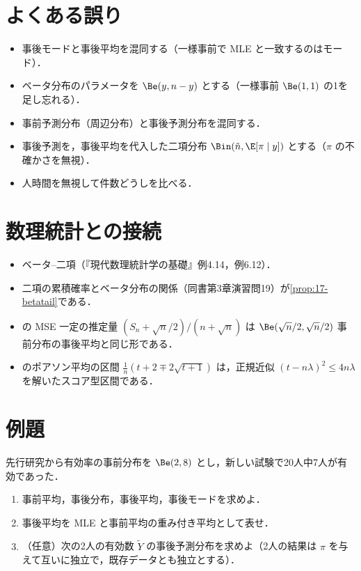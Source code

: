 \section{よくある誤り}\label{sec:17-err}
\begin{warnbox}
\begin{itemize}
\item 事後モードと事後平均を混同する（一様事前で MLE と一致するのはモード）．
\item ベータ分布のパラメータを $\Be(y,n-y)$ とする（一様事前 $\Be(1,1)$ の1を足し忘れる）．
\item 事前予測分布（周辺分布）と事後予測分布を混同する．
\item 事後予測を，事後平均を代入した二項分布 $\Bin(\tilde n,\E[\pi\mid y])$ とする（$\pi$ の不確かさを無視）．
\item 人時間を無視して件数どうしを比べる．
\end{itemize}
\end{warnbox}

\section{数理統計との接続}\label{sec:17-link}
\begin{linkbox}
\begin{itemize}
\item ベータ--二項（『現代数理統計学の基礎』例4.14，例6.12）．
\item 二項の累積確率とベータ分布の関係（同書第3章演習問19）が\cref{prop:17-betatail}である．
\item {} の MSE 一定の推定量 $(S_n+\sqrt n/2)/(n+\sqrt n)$ は $\Be(\sqrt n/2,\sqrt n/2)$ 事前分布の事後平均と同じ形である．
\item {} のポアソン平均の区間 $\frac1n(t+2\mp2\sqrt{t+1})$ は，正規近似 $(t-n\lambda)^2\le4n\lambda$ を解いたスコア型区間である．
\end{itemize}
\end{linkbox}

\section{例題}\label{sec:17-ex}
\begin{reidai}\label{reidai:17-1}
先行研究から有効率の事前分布を $\Be(2,8)$ とし，新しい試験で20人中7人が有効であった．
\begin{enumerate}[label=(\arabic*)]
\item 事前平均，事後分布，事後平均，事後モードを求めよ．
\item 事後平均を MLE と事前平均の重み付き平均として表せ．
\item （任意）次の2人の有効数 $\tilde Y$ の事後予測分布を求めよ（2人の結果は $\pi$ を与えて互いに独立で，既存データとも独立とする）．
\end{enumerate}
\end{reidai}

